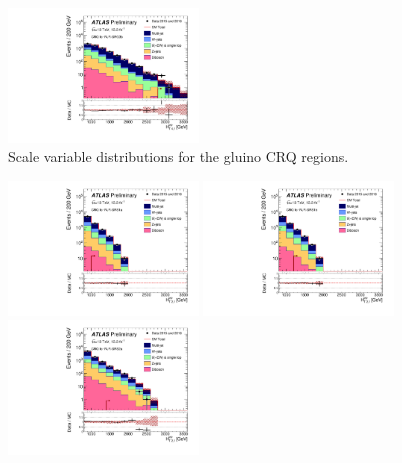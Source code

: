 \begin{figure}[tbph]
\begin{center}
\includegraphics[width=0.45\textwidth]{figures/ATLAS-CONF-2016-078_INT/N-1Plots/AtlasStyle/Preliminary/CRQ_SRJigsawSRG3b_LastCut_CRQ_minusone}
\end{center}
\caption{Scale variable distributions for the gluino CRQ regions.}
\label{fig:CRQ_SRJigsawSRG1a_LastCut_CRQ_minusone}
\end{figure}

\begin{figure}[tbph]
\begin{center}
\includegraphics[width=0.45\textwidth]{figures/ATLAS-CONF-2016-078_INT/N-1Plots/AtlasStyle/Preliminary/CRQ_SRJigsawSRS1a_LastCut_CRQ_minusone}
\includegraphics[width=0.45\textwidth]{figures/ATLAS-CONF-2016-078_INT/N-1Plots/AtlasStyle/Preliminary/CRQ_SRJigsawSRS1b_LastCut_CRQ_minusone}
\includegraphics[width=0.45\textwidth]{figures/ATLAS-CONF-2016-078_INT/N-1Plots/AtlasStyle/Preliminary/CRQ_SRJigsawSRS2a_LastCut_CRQ_minusone}

\end{center}
\end{figure}
